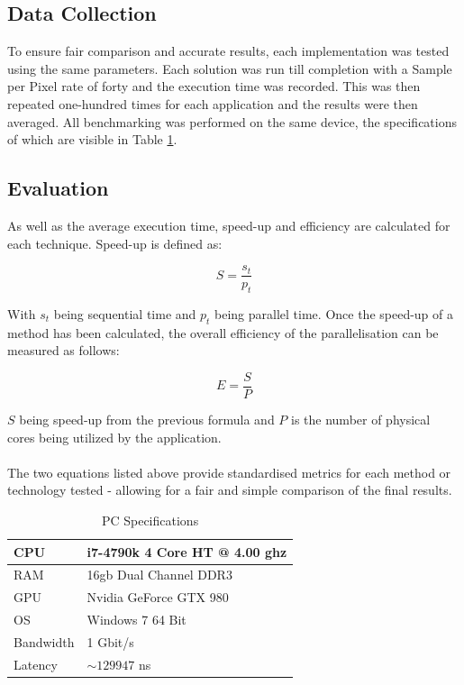 \documentclass[journal,transmag]{IEEEtran}
\begin{document}
	\subsection{Data Collection}
		To ensure fair comparison and accurate results, each implementation was tested using the same parameters. Each solution was run till completion with a Sample per Pixel rate of forty and the execution time was recorded. This was then repeated one-hundred times for each application and the results were then averaged. All benchmarking was performed on the same device, the specifications of which are visible in Table \ref{pcSpecsTable}. 
		
	\subsection{Evaluation}
		As well as the average execution time, speed-up and efficiency are calculated for each technique. Speed-up is defined as: 
		
		\[S=\frac{s_{t}}{p_{t}}\]
		
		\noindent With \(s_{t}\) being sequential time and \(p_{t}\) being parallel time.
		Once the speed-up of a method has been calculated, the overall efficiency of the parallelisation can be measured as follows:
		
		\[E = \frac{S}{P}\]
		
		\noindent \(S\) being speed-up from the previous formula and \(P\) is the number of physical cores being utilized by the application.
		\\\\The two equations listed above provide standardised metrics for each method or technology tested - allowing for a fair and simple comparison of the final results.
		
\begin{table}[]
	\centering
	\caption{PC Specifications}
	\label{pcSpecsTable}
	\begin{tabular}{|l|l|}
		\hline
		CPU & i7-4790k 4 Core HT @ 4.00 ghz \\ \hline
		RAM & 16gb Dual Channel DDR3        \\ \hline
		GPU & Nvidia GeForce GTX 980        \\ \hline
		OS  & Windows 7 64 Bit              \\ \hline
		Bandwidth & 1 Gbit/s  				\\ \hline
		Latency   & $\sim129947$ ns 		\\ \hline
	\end{tabular}
\end{table}
		
\end{document}
